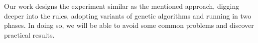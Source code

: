 \documentclass{article}
\begin{document}
Our work designs the experiment similar as the mentioned approach,
digging deeper into the rules, adopting variants of genetic algorithms and running in two phases.
In doing so, we will be able to avoid some common problems and discover practical results.






\end{document}
